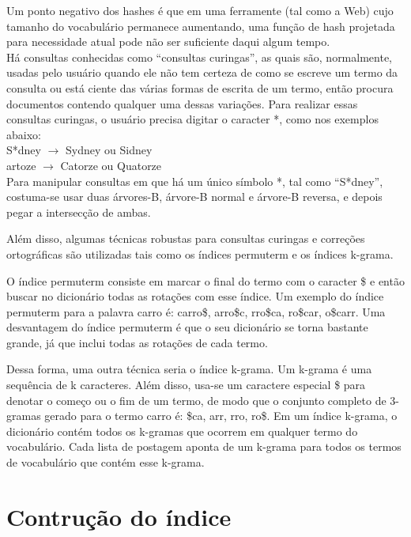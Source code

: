  Um ponto negativo dos hashes é que em uma ferramente (tal como a Web) cujo tamanho do vocabulário permanece aumentando, uma função de hash projetada para necessidade atual pode não ser suficiente daqui algum tempo. \\
  
  Há consultas conhecidas como “consultas curingas”, as quais são, normalmente, usadas pelo usuário quando ele não tem certeza de como se escreve um termo da consulta ou está ciente das várias formas de escrita de um termo, então procura documentos contendo qualquer uma dessas variações. Para realizar essas consultas curingas, o usuário precisa digitar o caracter *, como nos exemplos abaixo: \\
    
\indent S*dney $\rightarrow$ Sydney ou Sidney \\
\indent *artoze $\rightarrow$ Catorze ou Quatorze \\

  Para manipular consultas em que há um único símbolo *, tal como “S*dney”, costuma-se usar duas árvores-B, árvore-B normal e árvore-B reversa, e depois pegar a intersecção de ambas.    

  Além disso, algumas técnicas robustas para consultas curingas e correções ortográficas são utilizadas tais como os índices permuterm e os índices k-grama. 
    
  O índice permuterm consiste em marcar o final do termo com o caracter \$ e então buscar no dicionário todas as rotações com esse índice. Um exemplo do índice permuterm para a palavra carro é:  carro\$, arro\$c, rro\$ca, ro\$car, o\$carr. Uma desvantagem do índice permuterm é que o seu dicionário se torna bastante grande, já que inclui todas as rotações de cada termo. 
    
  Dessa forma, uma outra técnica seria o índice k-grama. Um k-grama é uma sequência de k caracteres. Além disso, usa-se um caractere especial \$ para denotar o começo ou o fim de um termo, de modo que o conjunto completo de 3-gramas gerado para o termo carro é: \$ca, arr, rro, ro\$. Em um índice k-grama, o dicionário contém todos os k-gramas que ocorrem em qualquer termo do  vocabulário. Cada lista de postagem aponta de um k-grama para todos os termos de vocabulário que contém esse k-grama.

\section{Contrução do índice}
\label{sec:construcao_indice}

